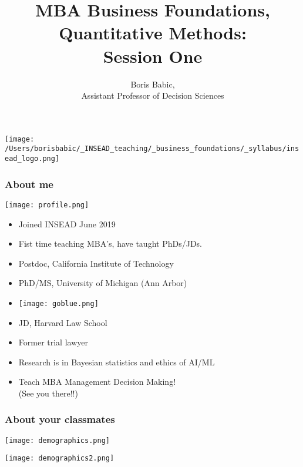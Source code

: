 \documentclass[xcolor=dvipsnames, 9pt]{beamer} %
\title[Session 1 (Basics)]{\normalsize{MBA Business Foundations, \\Quantitative Methods: \\Session One}}
\author[Boris Babic, INSEAD]{Boris Babic, \\Assistant Professor of Decision Sciences}
\institute[]{}
\date{}
\begin{document}
\begin{frame}
\titlepage
\vspace{-5em}
\begin{center}
\texttt{[image: /Users/borisbabic/\_INSEAD\_teaching/\_business\_foundations/\_syllabus/insead\_logo.png]}
\end{center}
\end{frame}

\begin{frame}
\frametitle{About me}
\begin{flushright}
\texttt{[image: profile.png]}
\end{flushright}
\vspace{-11em}
\begin{itemize}
	\setlength\itemsep{1em}
\item Joined INSEAD June 2019
\item Fist time teaching MBA's, have taught PhDs/JDs.
\item Postdoc, California Institute of Technology
\item PhD/MS, University of Michigan (Ann Arbor) 
\item[] \texttt{[image: goblue.png]}
\item JD, Harvard Law School 
\item Former trial lawyer 
\item Research is in Bayesian statistics and ethics of AI/ML 
\item Teach MBA Management Decision Making! \\ (See you there!!)
\end{itemize}
\end{frame}


\begin{frame}
\frametitle{About your classmates}

\begin{center}
\texttt{[image: demographics.png]}
\end{center}

\begin{center}
\texttt{[image: demographics2.png]}
\end{center}

\end{frame}
\end{document}
